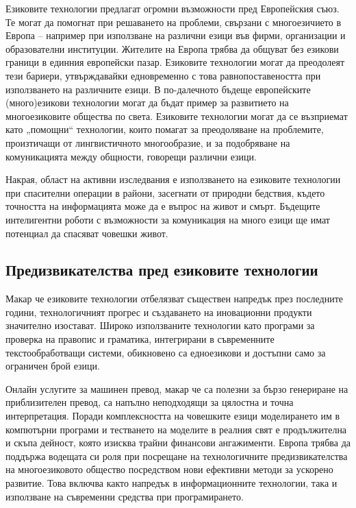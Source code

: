 \begin{multicols}{2}
  Езиковите технологии предлагат огромни възможности пред Европейския
   съюз. Те могат да помогнат при решаването на проблеми, свързани с многоезичието в Европа – например при използване на различни езици във фирми, организации и образователни институции. Жителите на Европа трябва  да общуват без езикови граници в единния европейски пазар.  Езиковите технологии могат да преодолеят тези бариери, утвърждавайки едновременно с това равнопоставеността при използването на различните езици. 
  В по-далечното бъдеще европейските (много)езикови технологии могат да бъдат пример за развитието на многоезиковите общества по света.
   Езиковите технологии могат да се възприемат като „помощни“ технологии, които помагат за преодоляване на проблемите, произтичащи от лингвистичното многообразие, и за подобряване на комуникацията между общности, говорещи различни езици.

  Накрая, област на активни изследвания е използването на езиковите технологии при спасителни операции в райони, засегнати от природни бедствия, където
   точността на информацията може да е въпрос на живот и смърт. Бъдещите интелигентни роботи с възможности за комуникация на много езици ще имат потенциал да спасяват човешки живот.
\vfill

  \subsection{Предизвикателства пред езиковите технологии}

  Макар че езиковите технологии отбелязват съществен
   напредък през последните години,
   технологичният прогрес и създаването на иновационни продукти значително изостават. Широко използваните технологии като програми за проверка на правопис и граматика, интегрирани в съвременните текстообработващи системи, 
  обикновено са едноезикови и достъпни само за ограничен брой езици. 


  Онлайн услугите за машинен превод, макар че са полезни за бързо генериране на приблизителен превод, са напълно неподходящи за цялостна и точна интерпретация. Поради комплексността на човешките езици моделирането им в компютърни програми и тестването на моделите в реалния свят е продължителна и скъпа дейност, която изисква трайни финансови ангажименти.  
  Европа трябва да поддържа водещата си роля при посрещане на технологичните предизвикателства на многоезиковото общество посредством нови ефективни методи за ускорено развитие. Това включва както напредък в информационните технологии, така и използване на съвременни средства при програмирането.


\end{multicols}
